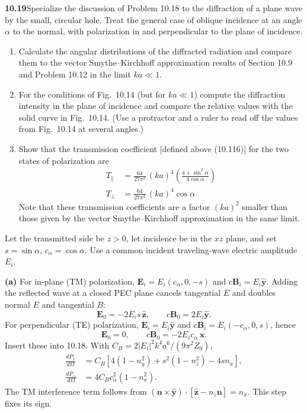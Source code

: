 \par\bigskip
\noindent\textbf{10.19}\quad Specialize the discussion of Problem 10.18 to the diffraction of a plane wave by the small, circular hole. Treat the general case of oblique incidence at an angle $\alpha$ to the normal, with polarization in and perpendicular to the plane of incidence.
\begin{enumerate}
\item[(a)] Calculate the angular distributions of the diffracted radiation and compare them to the vector Smythe--Kirchhoff approximation results of Section 10.9 and Problem 10.12 in the limit $ka\ll1$.
\item[(b)] For the conditions of Fig.~10.14 (but for $ka\ll1$) compute the diffraction intensity in the plane of incidence and compare the relative values with the solid curve in Fig.~10.14. (Use a protractor and a ruler to read off the values from Fig.~10.14 at several angles.)
\item[(c)] Show that the transmission coefficient [defined above (10.116)] for the two states of polarization are
\begin{align*}
T_{\parallel}&=\frac{64}{27\pi^{2}}\,(ka)^{4}\!\left(\frac{4+\sin^{2}\alpha}{4\cos\alpha}\right)\\[4pt]
T_{\perp}&=\frac{64}{27\pi^{2}}\,(ka)^{4}\cos\alpha
\end{align*}
Note that these transmission coefficients are a factor $(ka)^{2}$ smaller than those given by the vector Smythe--Kirchhoff approximation in the same limit.
\end{enumerate}
\solution
Let the transmitted side be $z>0$, let incidence be in the $xz$ plane,
and set $s=\sin\alpha$, $c_\alpha=\cos\alpha$.
Use a common incident traveling-wave electric amplitude $E_i$.

\textbf{(a)} For in-plane (TM) polarization,
$\mathbf E_i=E_i(c_\alpha,0,-s)$ and $c\mathbf B_i=E_i\widehat{\mathbf y}$.
Adding the reflected wave at a closed PEC plane cancels tangential $E$
and doubles normal $E$ and tangential $B$:
\[
\mathbf E_0=-2E_i s\,\widehat{\mathbf z},\qquad
c\mathbf B_0=2E_i\widehat{\mathbf y}.
\]
For perpendicular (TE) polarization,
$\mathbf E_i=E_i\widehat{\mathbf y}$ and
$c\mathbf B_i=E_i(-c_\alpha,0,s)$, hence
\[
\mathbf E_0=0,\qquad
c\mathbf B_0=-2E_i c_\alpha\,\widehat{\mathbf x}.
\]
Insert these into 10.18. With
$C_B=2|E_i|^2k^4a^6/(9\pi^2Z_0)$,
\[
\boxed{\begin{aligned}
\frac{dP_\parallel}{d\Omega}
&=C_B[4(1-n_y^2)+s^2(1-n_z^2)-4s n_x],\\
\frac{dP_\perp}{d\Omega}
&=4C_B c_\alpha^2(1-n_x^2).
\end{aligned}}
\]
The TM interference term follows from
$(\mathbf n\times\widehat{\mathbf y})\cdot
[\widehat{\mathbf z}-n_z\mathbf n]=n_x$.
This step fixes its sign.

